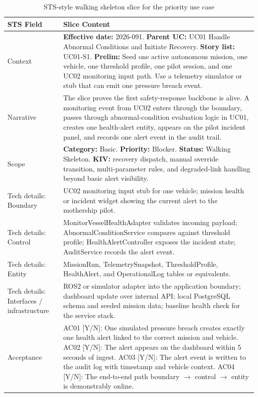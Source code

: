 \documentclass[10pt,a4paper]{article}
\begin{document}
\begin{table}[H]
\centering
\small
\renewcommand{\arraystretch}{1.15}
\begin{tabularx}{\textwidth}{|P{0.22\textwidth}|Y|}
\hline
{}
\textbf{STS Field} & \textbf{Slice Content} \\
\hline
Context & \textbf{Effective date:} 2026-091. \textbf{Parent UC:} UC01 Handle Abnormal Conditions and Initiate Recovery. \textbf{Story list:} UC01-S1. \textbf{Prelim:} Seed one active autonomous mission, one vehicle, one threshold profile, one pilot session, and one UC02 monitoring input path. Use a telemetry simulator or stub that can emit one pressure breach event. \\
\hline
Narrative & The slice proves the first safety-response backbone is alive. A monitoring event from UC02 enters through the boundary, passes through abnormal-condition evaluation logic in UC01, creates one health-alert entity, appears on the pilot incident panel, and records one alert event in the audit trail. \\
\hline
Scope & \textbf{Category:} Basic. \textbf{Priority:} Blocker. \textbf{Status:} Walking Skeleton. \textbf{KIV:} recovery dispatch, manual override transition, multi-parameter rules, and degraded-link handling beyond basic alert visibility. \\
\hline
Tech details: Boundary & UC02 monitoring input stub for one vehicle; mission health or incident widget showing the current alert to the mothership pilot. \\
\hline
Tech details: Control & MonitorVesselHealthAdapter validates incoming payload; AbnormalConditionService compares against threshold profile; HealthAlertController exposes the incident state; AuditService records the alert event. \\
\hline
Tech details: Entity & MissionRun, TelemetrySnapshot, ThresholdProfile, HealthAlert, and OperationalLog tables or equivalents. \\
\hline
Tech details: Interfaces / infrastructure & ROS2 or simulator adapter into the application boundary; dashboard update over internal API; local PostgreSQL schema and seeded mission data; baseline health check for the service stack. \\
\hline
Acceptance & AC01 [Y/N]: One simulated pressure breach creates exactly one health alert linked to the correct mission and vehicle. AC02 [Y/N]: The alert appears on the dashboard within 5 seconds of ingest. AC03 [Y/N]: The alert event is written to the audit log with timestamp and vehicle context. AC04 [Y/N]: The end-to-end path boundary $\rightarrow$ control $\rightarrow$ entity is demonstrably online. \\
\hline
\end{tabularx}
\caption{STS-style walking skeleton slice for the priority use case}
\label{tab:slice-ws}
\end{table}
\end{document}
